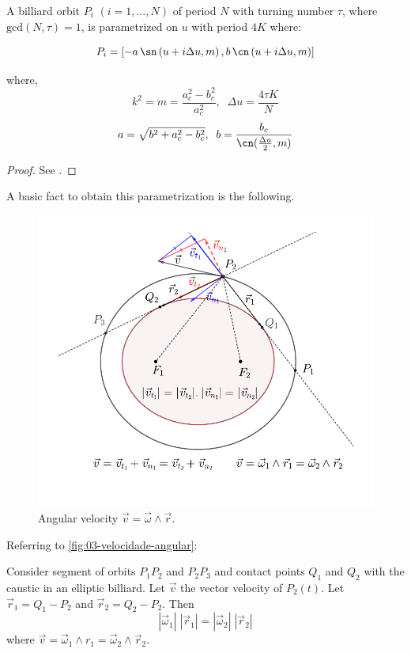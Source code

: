 \begin{theorem}
A billiard orbit $P_i$ $(i=1,\ldots, N) $ of period $N$  with turning number $\tau$, where $\mathrm{gcd}(N,\tau) =1$,  is parametrized on $u$ with period $4K$ where:


\[ 
P_i=
\left[-a\,\sn  \left(u+ i \Delta{u},  {m} \right) , b\,\cn  \left(u + i \Delta{u}, { m} \right)\right]
\]

where,
\[ k^2=m=\frac{a_c^2-b_c^2}{a_c^2},\;\;\Delta{u}=\frac{4\tau K}{N}\]
\[a= \sqrt{b^2+ a_c^2-b_c^2}, \;\; b=\frac{b_c}{\cn(\frac{\Delta{u}}{2}, m)}\]
\end{theorem}
\begin{proof} See \cite{stachel2021-billiards}.\end{proof}

A basic fact to obtain this parametrization is the following.

\begin{figure}
    \centering
    \includegraphics[width=\textwidth]{chap_03/pics/pics-cap2-100-param-jacobi.pdf}
    \caption{ Angular velocity $\vec v=\vec \omega\wedge \vec r$. } 
    \end{figure}
Referring to \cref{fig:03-velocidade-angular}:

\begin{proposition} 
Consider   segment of orbits $P_1P_2$ and $P_2P_3$  and contact points $Q_1$ and $Q_2$ with the caustic in an elliptic billiard. Let $\vec v$ the vector velocity of $P_2(t)$. Let $\vec r_1=Q_1-P_2$ and $\vec r_2=Q_2-P_2$. Then
\[ |\vec \omega_1|\;|\vec r_1|=|\vec \omega_2|\; |\vec r_2|\]
where $\vec v=\vec\omega_1\wedge r_1= \vec\omega_2\wedge \vec r_2$.

\label{fig:03-velocidade-angular}
\end{proposition}

